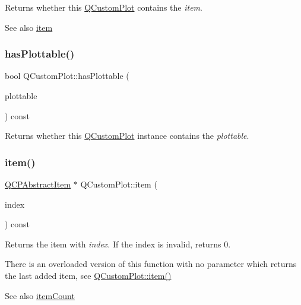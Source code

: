 Returns whether this \hyperlink{classQCustomPlot}{Q\+Custom\+Plot} contains the {\itshape item}.

\begin{DoxySeeAlso}{See also}
\hyperlink{classQCustomPlot_ac042f2e78edd228ccf2f26b7fe215239}{item} 
\end{DoxySeeAlso}
\mbox{\label{classQCustomPlot_a72cefbfbb9e699940e37be605bd9c51e}} 
\subsubsection{\texorpdfstring{has\+Plottable()}{hasPlottable()}}
{\footnotesize\ttfamily bool Q\+Custom\+Plot\+::has\+Plottable (\begin{DoxyParamCaption}\item[{\hyperlink{classQCPAbstractPlottable}{Q\+C\+P\+Abstract\+Plottable} $\ast$}]{plottable }\end{DoxyParamCaption}) const}

Returns whether this \hyperlink{classQCustomPlot}{Q\+Custom\+Plot} instance contains the {\itshape plottable}. \mbox{\label{classQCustomPlot_ac042f2e78edd228ccf2f26b7fe215239}} 
\subsubsection{\texorpdfstring{item()}{item()}\hspace{0.1cm}{\footnotesize\ttfamily [1/2]}}
{\footnotesize\ttfamily \hyperlink{classQCPAbstractItem}{Q\+C\+P\+Abstract\+Item} $\ast$ Q\+Custom\+Plot\+::item (\begin{DoxyParamCaption}\item[{int}]{index }\end{DoxyParamCaption}) const}

Returns the item with {\itshape index}. If the index is invalid, returns 0.

There is an overloaded version of this function with no parameter which returns the last added item, see \hyperlink{classQCustomPlot_ac042f2e78edd228ccf2f26b7fe215239}{Q\+Custom\+Plot\+::item()}

\begin{DoxySeeAlso}{See also}
\hyperlink{classQCustomPlot_a16025daf0341f9362be3080e404424c2}{item\+Count} 
\end{DoxySeeAlso}
\mbox{\label{classQCustomPlot_a12eb2a283cf10a8a9176c01c0443e83e}} 
